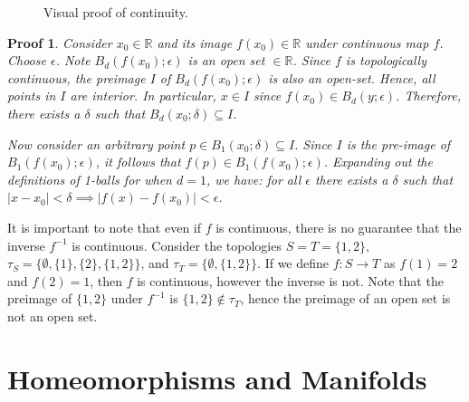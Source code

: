 \documentclass{article}
\newtheorem*{pf}{Proof}
\begin{document}
\begin{figure}[!htb]
    \caption{\label{fig:continuity} Visual proof of continuity. }
\end{figure}

\begin{pf}
    Consider $x_0 \in \mathbb{R}$ and its image $f(x_0) \in \mathbb{R}$ under
    continuous map $f$. Choose $\epsilon$. Note $B_d(f(x_0); \epsilon)$ is an
    open set $\in \mathbb{R}$. Since $f$ is topologically continuous, the
    preimage $I$ of $B_d(f(x_0); \epsilon)$ is also an open-set.  Hence, all
    points in $I$ are interior. In particular, $x \in I$ since $f(x_0) \in
    B_d(y;\epsilon)$.  Therefore, there exists a $\delta$ such that
    $B_d(x_0;\delta) \subseteq I$.

    Now consider an arbitrary point $p \in B_1(x_0;\delta) \subseteq I$. Since
    $I$ is the pre-image of $B_1(f(x_0); \epsilon)$, it follows that $f(p)
    \in B_1(f(x_0); \epsilon)$.
    Expanding out the definitions of 1-balls for when $d=1$, we have:
    for all $\epsilon$ there exists a $\delta$ such that $\mid x - x_0 \mid <
    \delta \implies \mid f(x) - f(x_0) \mid < \epsilon$.
\end{pf}

It is important to note that even if $f$ is continuous, there is no guarantee that
the inverse $f^{-1}$ is continuous. Consider the topologies $S = T
= \{1, 2\}$, $\tau_S = \{\emptyset, \{1\}, \{2\}, \{1, 2\}\}$, and $\tau_T =
\{\emptyset, \{1, 2\}\}$. If we define $f: S \rightarrow T$ as $f(1) = 2$
and $f(2) = 1$, then $f$ is continuous, however the inverse is not. Note that
the preimage of $\{1, 2\}$ under $f^{-1}$ is $\{1, 2\} \not\in
\tau_T$, hence the preimage of an open set is not an open set.

\section{Homeomorphisms and Manifolds}
\end{document}
